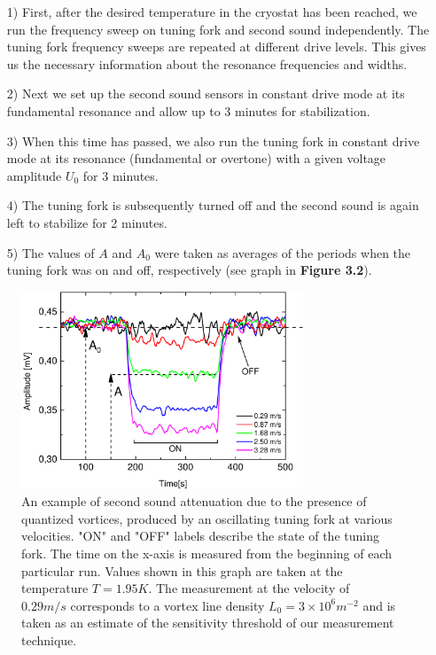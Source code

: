\begin{itemize}
	\item[1)] First, after the desired temperature in the cryostat has been reached, we run the frequency sweep on tuning fork and second sound independently. The tuning fork frequency sweeps are repeated at different drive levels. This gives us the necessary information about the resonance frequencies and widths.
	
	\item[2)] Next we set up the second sound sensors in constant drive mode at its fundamental resonance and allow up to 3 minutes for stabilization.
	
	\item[3)] When this time has passed, we also run the tuning fork in constant drive mode at its resonance (fundamental or overtone) with a given voltage amplitude $ U_0 $ for 3 minutes.
	
	\item[4)] The tuning fork is subsequently turned off and the second sound is again left to stabilize for 2 minutes.

	\item[5)] The values of $ A $ and $ A_0 $ were taken as averages of the periods when the tuning fork was on and off, respectively (see graph in {\sffamily\textbf{Figure 3.2}}).
\end{itemize}


\begin{figure}[h!]
\centering
\includegraphics[width=0.75\textwidth]{graphs/Attenuation.pdf}
\caption{An example of second sound attenuation due to the presence of quantized vortices, produced by an oscillating tuning fork at various velocities. "ON" and "OFF" labels describe the state of the tuning fork. The time on the x-axis is measured from the beginning  of each particular run. Values shown in this graph are taken at the temperature $ T=1.95\unit{K} $. The measurement at the velocity of $0.29\unit{m/s}$ corresponds to a vortex line density $L_0 = 3 \times 10^6 \unit{m}^{-2}$ and is taken as an estimate of the sensitivity threshold of our measurement technique.}
\end{figure}

